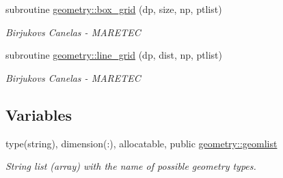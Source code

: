 \begin{DoxyCompactItemize}
subroutine \mbox{\hyperlink{namespacegeometry_ab7f40c137db819829d3110dac77a2977}{geometry\+::box\+\_\+grid}} (dp, size, np, ptlist)
\begin{DoxyCompactList}\small\item\em Birjukovs Canelas -\/ M\+A\+R\+E\+T\+EC \end{DoxyCompactList}\item 
subroutine \mbox{\hyperlink{namespacegeometry_a7d580229bc67448e6389d0beef0c04cb}{geometry\+::line\+\_\+grid}} (dp, dist, np, ptlist)
\begin{DoxyCompactList}\small\item\em Birjukovs Canelas -\/ M\+A\+R\+E\+T\+EC \end{DoxyCompactList}\end{DoxyCompactItemize}
\subsection*{Variables}
\begin{DoxyCompactItemize}
\item 
type(string), dimension(\+:), allocatable, public \mbox{\hyperlink{namespacegeometry_a879bd9ccab6fc42f051bbfc9f0560a62}{geometry\+::geomlist}}
\begin{DoxyCompactList}\small\item\em String list (array) with the name of possible geometry types. \end{DoxyCompactList}\end{DoxyCompactItemize}
